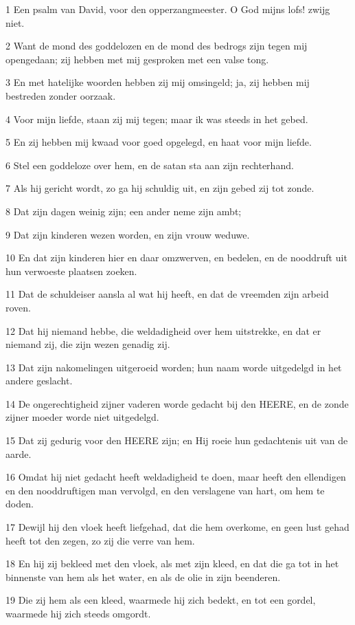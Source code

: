 \par 1 Een psalm van David, voor den opperzangmeester. O God mijns lofs! zwijg niet.
\par 2 Want de mond des goddelozen en de mond des bedrogs zijn tegen mij opengedaan; zij hebben met mij gesproken met een valse tong.
\par 3 En met hatelijke woorden hebben zij mij omsingeld; ja, zij hebben mij bestreden zonder oorzaak.
\par 4 Voor mijn liefde, staan zij mij tegen; maar ik was steeds in het gebed.
\par 5 En zij hebben mij kwaad voor goed opgelegd, en haat voor mijn liefde.
\par 6 Stel een goddeloze over hem, en de satan sta aan zijn rechterhand.
\par 7 Als hij gericht wordt, zo ga hij schuldig uit, en zijn gebed zij tot zonde.
\par 8 Dat zijn dagen weinig zijn; een ander neme zijn ambt;
\par 9 Dat zijn kinderen wezen worden, en zijn vrouw weduwe.
\par 10 En dat zijn kinderen hier en daar omzwerven, en bedelen, en de nooddruft uit hun verwoeste plaatsen zoeken.
\par 11 Dat de schuldeiser aansla al wat hij heeft, en dat de vreemden zijn arbeid roven.
\par 12 Dat hij niemand hebbe, die weldadigheid over hem uitstrekke, en dat er niemand zij, die zijn wezen genadig zij.
\par 13 Dat zijn nakomelingen uitgeroeid worden; hun naam worde uitgedelgd in het andere geslacht.
\par 14 De ongerechtigheid zijner vaderen worde gedacht bij den HEERE, en de zonde zijner moeder worde niet uitgedelgd.
\par 15 Dat zij gedurig voor den HEERE zijn; en Hij roeie hun gedachtenis uit van de aarde.
\par 16 Omdat hij niet gedacht heeft weldadigheid te doen, maar heeft den ellendigen en den nooddruftigen man vervolgd, en den verslagene van hart, om hem te doden.
\par 17 Dewijl hij den vloek heeft liefgehad, dat die hem overkome, en geen lust gehad heeft tot den zegen, zo zij die verre van hem.
\par 18 En hij zij bekleed met den vloek, als met zijn kleed, en dat die ga tot in het binnenste van hem als het water, en als de olie in zijn beenderen.
\par 19 Die zij hem als een kleed, waarmede hij zich bedekt, en tot een gordel, waarmede hij zich steeds omgordt.
